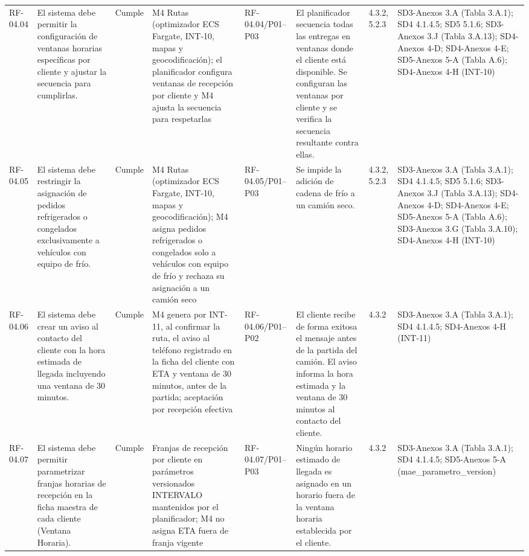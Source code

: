 \documentclass[oficio,firma,final]{lafrox}
\begin{document}
\begin{landscape}
{\begin{longtable}{@{}F{0.054} F{0.173} F{0.061} F{0.191} F{0.106} F{0.180} F{0.067} F{0.168}@{}}
  RF-04.04 & El sistema debe permitir la configuración de ventanas horarias específicas por cliente y ajustar la secuencia para cumplirlas. & Cumple & M4 Rutas (optimizador ECS Fargate, INT-10, mapas y geocodificación); el planificador configura ventanas de recepción por cliente y M4 ajusta la secuencia para respetarlas & RF-04.04/\allowbreak{}P01--\allowbreak{}P03 & El planificador secuencia todas las entregas en ventanas donde el cliente está disponible. Se configuran las ventanas por cliente y se verifica la secuencia resultante contra ellas. & 4.3.2, 5.2.3 & SD3-Anexos 3.A (Tabla 3.A.1); SD4 4.1.4.5; SD5 5.1.6; SD3-Anexos 3.J (Tabla 3.A.13); SD4-Anexos 4-D; SD4-Anexos 4-E; SD5-Anexos 5-A (Tabla A.6); SD4-Anexos 4-H (INT-10)  \\
  RF-04.05 & El sistema debe restringir la asignación de pedidos refrigerados o congelados exclusivamente a vehículos con equipo de frío. & Cumple & M4 Rutas (optimizador ECS Fargate, INT-10, mapas y geocodificación); M4 asigna pedidos refrigerados o congelados solo a vehículos con equipo de frío y rechaza su asignación a un camión seco & RF-04.05/\allowbreak{}P01--\allowbreak{}P03 & Se impide la adición de cadena de frío a un camión seco. & 4.3.2, 5.2.3 & SD3-Anexos 3.A (Tabla 3.A.1); SD4 4.1.4.5; SD5 5.1.6; SD3-Anexos 3.J (Tabla 3.A.13); SD4-Anexos 4-D; SD4-Anexos 4-E; SD5-Anexos 5-A (Tabla A.6); SD3-Anexos 3.G (Tabla 3.A.10); SD4-Anexos 4-H (INT-10)  \\
  RF-04.06 & El sistema debe crear un aviso al contacto del cliente con la hora estimada de llegada incluyendo una ventana de 30 minutos. & Cumple & M4 genera por INT-11, al confirmar la ruta, el aviso al teléfono registrado en la ficha del cliente con ETA y ventana de 30 minutos, antes de la partida; aceptación por recepción efectiva & RF-04.06/\allowbreak{}P01--\allowbreak{}P02 & El cliente recibe de forma exitosa el mensaje antes de la partida del camión. El aviso informa la hora estimada y la ventana de 30 minutos al contacto del cliente. & 4.3.2 & SD3-Anexos 3.A (Tabla 3.A.1); SD4 4.1.4.5; SD4-Anexos 4-H (INT-11)  \\
  RF-04.07 & El sistema debe permitir parametrizar franjas horarias de recepción en la ficha maestra de cada cliente (Ventana Horaria). & Cumple & Franjas de recepción por cliente en parámetros versionados INTERVALO mantenidos por el planificador; M4 no asigna ETA fuera de franja vigente & RF-04.07/\allowbreak{}P01--\allowbreak{}P03 & Ningún horario estimado de llegada es asignado en un horario fuera de la ventana horaria establecida por el cliente. & 4.3.2 & SD3-Anexos 3.A (Tabla 3.A.1); SD4 4.1.4.5; SD5-Anexos 5-A (mae\_parametro\_version)  \\

\end{longtable}}
\end{landscape}
\end{document}
